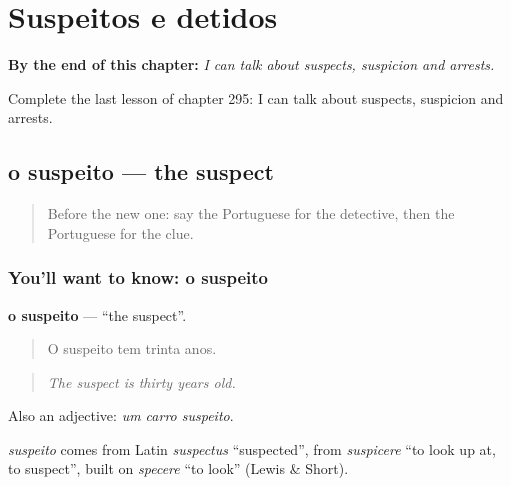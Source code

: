 
\chapter{Suspeitos e detidos}
\label{ch:pt-suspeitos-e-detidos}

\begin{chapteropening}
\textbf{By the end of this chapter:} \emph{I can talk about suspects, suspicion and arrests.}

Complete the last lesson of chapter 295: I can talk about suspects, suspicion and arrests.
\end{chapteropening}

\section[o suspeito]{o suspeito — the suspect}

\label{lesson:PT-C295-suspeito}



\begin{quote}
Before the new one: say the Portuguese for the detective, then the Portuguese for the clue.
\end{quote}

\subsection*{You'll want to know: o suspeito}
\textbf{o suspeito} — \textquotedblleft{}the suspect\textquotedblright{}.

\begin{quote}
O suspeito tem trinta anos.
\end{quote}

\begin{quote}
\emph{The suspect is thirty years old.}
\end{quote}

Also an adjective: \emph{um carro suspeito}.

\begin{cousinweb}
\emph{suspeito} comes from Latin \emph{suspectus} \textquotedblleft{}suspected\textquotedblright{}, from \emph{suspicere} \textquotedblleft{}to look up at, to suspect\textquotedblright{}, built on \emph{specere} \textquotedblleft{}to look\textquotedblright{} (Lewis \& Short).
\end{cousinweb}

